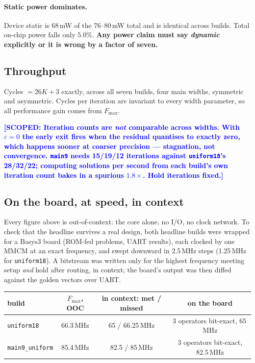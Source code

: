 \documentclass[11pt,a4paper]{article}
\newcommand{\scoped}[1]{\textcolor{blue}{\textbf{[SCOPED: #1]}}}
\begin{document}
\paragraph{Static power dominates.} Device static is 68\,mW of the 76--80\,mW
total and is identical across builds. Total on-chip power falls only $5.0\%$.
\textbf{Any power claim must say \emph{dynamic} explicitly or it is wrong by a
factor of seven.}

\subsection{Throughput}

Cycles $= 26K + 3$ exactly, across all seven builds, four main widths,
symmetric and asymmetric. Cycles per iteration are invariant to every width
parameter, so all performance gain comes from $F_{\max}$.

\scoped{Iteration counts are \emph{not} comparable across widths. With
$\varepsilon = 0$ the early exit fires when the residual quantises to exactly
zero, which happens sooner at coarser precision --- stagnation, not
convergence. \texttt{main9} needs 15/19/12 iterations against
\texttt{uniform18}'s 28/32/22; computing solutions per second from each build's
own iteration count bakes in a spurious $1.8\times$. Hold iterations fixed.}

\subsection{On the board, at speed, in context}

Every figure above is out-of-context: the core alone, no I/O, no clock
network. To check that the headline survives a real design, both headline
builds were wrapped for a Basys3 board (ROM-fed problems, UART results), each
clocked by one MMCM at an exact frequency, and swept downward in 2.5\,MHz
steps (1.25\,MHz for \texttt{uniform18}). A bitstream was written only for the
highest frequency meeting setup \emph{and} hold after routing, in context;
the board's output was then diffed against the golden vectors over UART.

\begin{table}[h]\centering\small
\begin{tabular}{lccc}
\toprule
build & $F_{\max}$, OOC & in context: met / missed & on the board \\
\midrule
\texttt{uniform18}      & 66.3\,MHz & 65 / 66.25\,MHz & 3 operators bit-exact, 65\,MHz \\
\texttt{main9\_uniform} & 85.4\,MHz & 82.5 / 85\,MHz  & 3 operators bit-exact, 82.5\,MHz \\
\bottomrule
\end{tabular}
\end{table}
\end{document}
